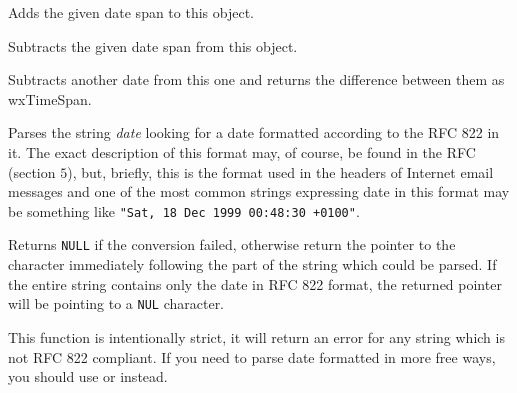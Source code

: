 

Adds the given date span to this object.


\label{wxdatetimesubtractds}




Subtracts the given date span from this object.


\label{wxdatetimesubtractdt}


Subtracts another date from this one and returns the difference between them
as wxTimeSpan.


\label{wxdatetimeparserfc822date}


Parses the string {\it date} looking for a date formatted according to the RFC
822 in it. The exact description of this format may, of course, be found in
the RFC (section $5$), but, briefly, this is the format used in the headers of
Internet email messages and one of the most common strings expressing date in
this format may be something like {\tt "Sat, 18 Dec 1999 00:48:30 +0100"}.

Returns {\tt NULL} if the conversion failed, otherwise return the pointer to
the character immediately following the part of the string which could be
parsed. If the entire string contains only the date in RFC 822 format,
the returned pointer will be pointing to a {\tt NUL} character.

This function is intentionally strict, it will return an error for any string
which is not RFC 822 compliant. If you need to parse date formatted in more
free ways, you should use  or
 instead.


